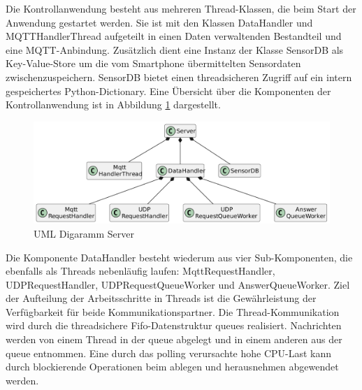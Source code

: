 \documentclass[11pt,a4paper]{report}
\begin{document}
Die Kontrollanwendung besteht aus mehreren Thread-Klassen, die beim Start der Anwendung gestartet werden.
Sie ist mit den Klassen DataHandler und MQTTHandlerThread aufgeteilt in einen Daten verwaltenden Bestandteil und eine MQTT-Anbindung.
Zusätzlich dient eine Instanz der Klasse SensorDB als Key-Value-Store um die vom Smartphone übermittelten Sensordaten zwischenzuspeichern.
SensorDB bietet einen threadsicheren Zugriff auf ein intern gespeichertes Python-Dictionary.
Eine Übersicht über die Komponenten der Kontrollanwendung ist in Abbildung \ref{fig:serverUml} dargestellt.
\begin{figure}[htbp]
  \centering
  \includegraphics[width=\textwidth]{images/ServerUml}
  \caption{UML Digaramm Server}
  \label{fig:serverUml}
\end{figure}

Die Komponente DataHandler besteht wiederum aus vier Sub-Komponenten, die ebenfalls als Threads nebenläufig laufen: MqttRequestHandler, UDPRequestHandler, UDPRequestQueueWorker und AnswerQueueWorker.
Ziel der Aufteilung der Arbeitsschritte in Threads ist die Gewährleistung der Verfügbarkeit für beide Kommunikationspartner.
Die Thread-Kommunikation wird durch die threadsichere Fifo-Datenstruktur queues \cite{python_queue} realisiert.
Nachrichten werden von einem Thread in der queue abgelegt und in einem anderen aus der queue entnommen.
Eine durch das polling verursachte hohe CPU-Last kann durch blockierende Operationen beim ablegen und herausnehmen abgewendet werden.
\end{document}
